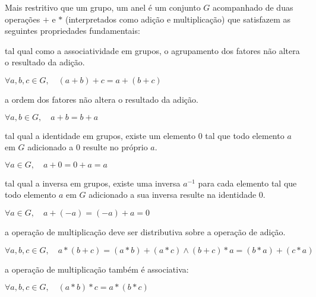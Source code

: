 \documentclass[12pt]{article}
\begin{document}
Mais restritivo que um grupo, um anel é um conjunto $G$ acompanhado de duas
operações $+$ e $*$ (interpretados como adição e multiplicação) que satisfazem
as seguintes propriedades fundamentais:

\begin{description}
    \setlength\itemsep{1em}

    \item[Associatividade aditiva:] tal qual como a associatividade em grupos,
        o agrupamento  dos fatores não altera o resultado da adição.
        \newline
        \begin{center}
            $\forall a, b, c \in G, \quad (a+b)+c = a+(b+c)$
        \end{center}

    \item[Comutatividade aditiva:] a ordem dos fatores não altera o resultado
        da adição.
        \newline
        \begin{center}
            $\forall a, b \in G, \quad a+b = b+a$
        \end{center}

    \item[Identidade aditiva:] tal qual a identidade em grupos, existe um
        elemento $0$ tal que todo elemento $a$ em $G$ adicionado a $0$ resulte
        no próprio $a$.
        \newline
        \begin{center}
            $\forall a \in G, \quad a+0 = 0+a = a$
        \end{center}

    \item[Inversa aditiva:] tal qual a inversa em grupos, existe uma inversa
        $a^{-1}$ para cada elemento tal que todo elemento $a$ em $G$ adicionado
        a sua inversa resulte na identidade $0$.
        \newline
        \begin{center}
            $\forall a \in G, \quad a+(-a) = (-a)+a = 0$
        \end{center}

    \item[Distributividade:] a operação de multiplicação deve ser distributiva
        sobre a operação de adição.
        \newline
        \begin{center}
            $\forall a, b, c \in G, \quad a*(b+c) = (a*b)+(a*c) \land (b+c)*a = (b*a)+(c*a)$
        \end{center}

    \item[Associatividade multiplicativa:] a operação de multiplicação também é
        associativa:
        \newline
        \begin{center}
            $\forall a, b, c \in G, \quad (a*b)*c = a*(b*c)$
        \end{center}

\end{description}
\end{document}
